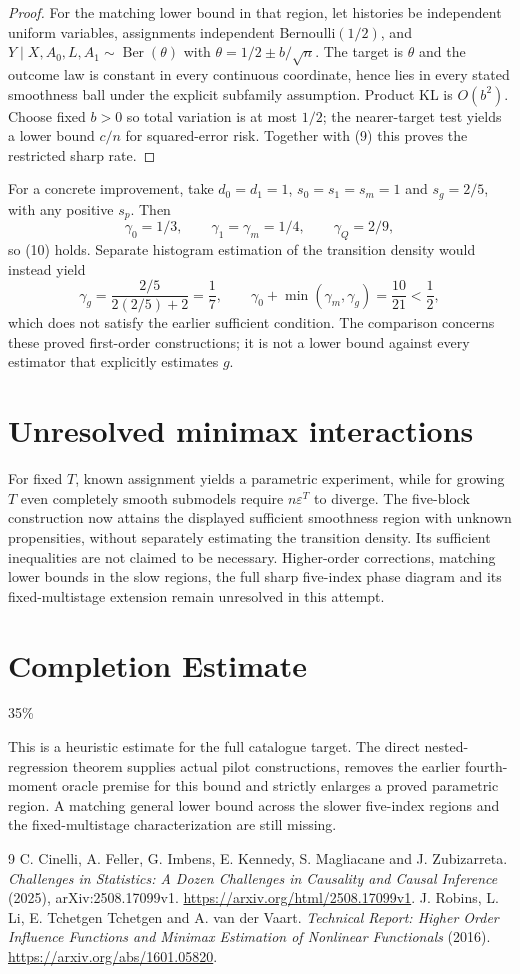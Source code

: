 \documentclass[11pt]{article}
\theoremstyle{definition}
\begin{document}
\begin{proof}
For the matching lower bound in that region, let histories be independent
uniform variables, assignments independent Bernoulli$(1/2)$, and
$Y\mid X,A_0,L,A_1\sim\operatorname{Ber}(\theta)$ with
$\theta=1/2\pm b/\sqrt n$. The target is $\theta$ and the outcome
law is constant in every continuous coordinate, hence lies in every
stated smoothness ball under the explicit subfamily assumption. Product
KL is $O(b^2)$. Choose fixed $b>0$ so total variation is at most $1/2$;
the nearer-target test yields a lower bound $c/n$ for squared-error risk.
Together with (9) this proves the restricted sharp rate.
\end{proof}

For a concrete improvement, take $d_0=d_1=1$, $s_0=s_1=s_m=1$ and
$s_g=2/5$, with any positive $s_p$. Then
\[
 \gamma_0=1/3,\qquad \gamma_1=\gamma_m=1/4,\qquad \gamma_Q=2/9,
\]
so (10) holds. Separate histogram estimation of the transition density
would instead yield
\[
 \gamma_g=\frac{2/5}{2(2/5)+2}=\frac17,\qquad
 \gamma_0+\min(\gamma_m,\gamma_g)=\frac{10}{21}<\frac12,
\]
which does not satisfy the earlier sufficient condition.
The comparison concerns these proved first-order constructions; it is not
a lower bound against every estimator that explicitly estimates $g$.

\section*{Unresolved minimax interactions}
For fixed $T$, known assignment yields a parametric experiment, while for
growing $T$ even completely smooth submodels require $n\varepsilon^T$
to diverge. The five-block construction now attains the displayed
sufficient smoothness region with unknown propensities, without separately
estimating the transition density. Its sufficient inequalities are not
claimed to be necessary. Higher-order corrections, matching lower bounds
in the slow regions, the full sharp five-index phase diagram and its
fixed-multistage extension remain unresolved in this attempt.

\section{Completion Estimate}
35\%

This is a heuristic estimate for the full catalogue target. The direct nested-regression theorem supplies actual pilot constructions, removes the earlier fourth-moment oracle premise for this bound and strictly enlarges a proved parametric region. A matching general lower bound across the slower five-index regions and the fixed-multistage characterization are still missing.

\begin{thebibliography}{9}
 C. Cinelli, A. Feller, G. Imbens, E. Kennedy, S. Magliacane and J. Zubizarreta.
\emph{Challenges in Statistics: A Dozen Challenges in Causality and Causal Inference} (2025), arXiv:2508.17099v1.
\url{https://arxiv.org/html/2508.17099v1}.
 J. Robins, L. Li, E. Tchetgen Tchetgen and A. van der Vaart.
\emph{Technical Report: Higher Order Influence Functions and Minimax Estimation of Nonlinear Functionals} (2016).
\url{https://arxiv.org/abs/1601.05820}.
\end{thebibliography}
\end{document}
